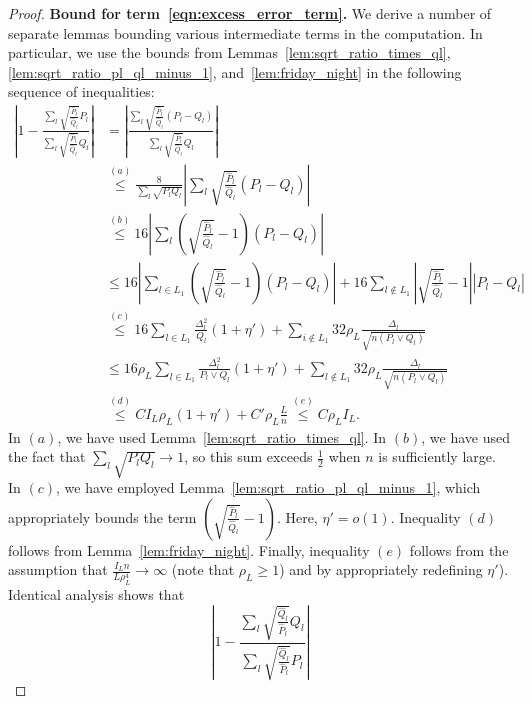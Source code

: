 \documentclass{article}
\begin{document}
\begin{proof}
\noindent \textbf{Bound for term~\eqref{eqn:excess_error_term}.} 
We derive a number of separate lemmas bounding various intermediate terms in the computation. In particular, we use the bounds from Lemmas~\ref{lem:sqrt_ratio_times_ql}, \ref{lem:sqrt_ratio_pl_ql_minus_1}, and~\ref{lem:friday_night} in the following sequence of inequalities:
\begin{align*}
\left| 1 -  \frac{\sum_l \sqrt{\frac{\hat{P}_l}{\hat{Q}_l} } P_l}
                {\sum_l \sqrt{\frac{\hat{P}_l}{\hat{Q}_l} } Q_l}  \right|
 &= \left| \frac{ \sum_l \sqrt{ \frac{\hat{P}_l}{\hat{Q}_l}} (P_l - Q_l) }
     { \sum_l \sqrt{ \frac{\hat{P}_l}{\hat{Q}_l}} Q_l } \right| \\
&\stackrel{(a)}\leq \frac{8}{\sum_l \sqrt{P_l Q_l}} 
     \left| \sum_l \sqrt{ \frac{\hat{P}_l}{\hat{Q}_l} }(P_l - Q_l) \right| \\
&\stackrel{(b)}\leq 16 \left|  \sum_{l} \left( \sqrt{ \frac{\hat{P}_l}{\hat{Q}_l} } - 1 \right) (P_l - Q_l)  \right| \\
&\leq 16 \left| 
     \sum_{l \in L_1} \left( \sqrt{\frac{\hat{P}_l}{\hat{Q}_l}} - 1 \right)(P_l - Q_l) 
     \right| + 16 \sum_{l \notin L_1} \left| \sqrt{ \frac{\hat{P}_l}{\hat{Q}_l}} - 1 \right| |P_l - Q_l| \\
&\stackrel{(c)}\leq 16 \sum_{l \in L_1} \frac{\Delta^2_l}{Q_l}(1+ \eta') + 
      \sum_{i \notin L_1} 32 \rho_L \frac{\Delta_l}{\sqrt{n (P_l \vee Q_l)}} \\
%
&\leq 16 \rho_L \sum_{l \in L_1} \frac{\Delta^2_l}{P_l \vee Q_l} (1+ \eta') + 
      \sum_{l \notin L_1} 32 \rho_L \frac{\Delta_l}{\sqrt{n (P_l \vee Q_l)}} \\
&\stackrel{(d)}\leq C I_L  \rho_L(1 + \eta') + C' \rho_L \frac{L}{n} \stackrel{(e)} \leq C \rho_L I_L. 
\end{align*}
In $(a)$, we have used Lemma~\ref{lem:sqrt_ratio_times_ql}. In $(b)$, we have used the fact that $\sum_l  \sqrt{P_l Q_l}  \to 1$, so this sum exceeds $\frac{1}{2}$ when $n$ is sufficiently large. In $(c)$, we have employed Lemma~\ref{lem:sqrt_ratio_pl_ql_minus_1}, which appropriately bounds the term $\left( \sqrt{\frac{\hat{P}_l}{\hat{Q}_l}} - 1 \right)$. Here, $\eta' = o(1)$. Inequality $(d)$ follows from Lemma~\ref{lem:friday_night}. Finally, inequality $(e)$ follows from the assumption that $\frac{I_L n}{L \rho_L^4} \rightarrow \infty$ (note that $\rho_L \geq 1$) and by appropriately redefining $\eta'$). Identical analysis shows that
\[
\left| 1 - \frac{ \sum_l \sqrt{\frac{\hat{Q}_l}{\hat{P}_l} } Q_l}
             { \sum_l \sqrt{\frac{\hat{Q}_l}{\hat{P}_l} } P_l} \right| 
\]
\end{proof}
\end{document}

